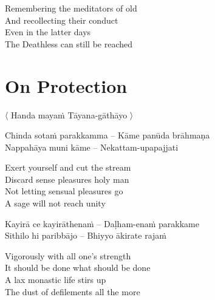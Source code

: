\begin{english-verses}
  Remembering the meditators of old\\
  And recollecting their conduct\\
  Even in the latter days\\
  The Deathless can still be reached
\end{english-verses}

\suttaRef{[Thag 16.10]}


\section{On Protection}
\label{protection}

\begin{leader}
  〈 Handa mayaṁ Tāyana-gāthāyo 〉

\end{leader}

\begin{twochants}
  Chinda sotaṁ parakkamma – Kāme panūda brāhmaṇa\\
  Nappahāya muni kāme – Nekattam-upapajjati\\
\end{twochants}

\begin{english-verses}
  Exert yourself and cut the stream\\
  Discard sense pleasures holy man\\
  Not letting sensual pleasures go\\
  A sage will not reach unity
\end{english-verses}

\begin{twochants}
  Kayirā ce kayirāthenaṁ – Daḷham-enaṁ parakkame\\
  Sithilo hi paribbājo – Bhiyyo ākirate rajaṁ\\
\end{twochants}

\begin{english-verses}
  Vigorously with all one's strength\\
  It should be done what should be done\\
  A lax monastic life stirs up\\
  The dust of defilements all the more
\end{english-verses}

